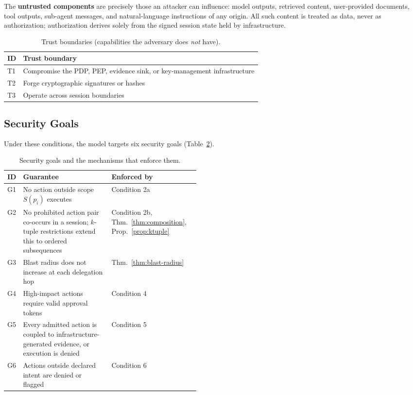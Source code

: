 \documentclass[sigconf,nonacm]{acmart}
\begin{document}
The \textbf{untrusted components} are precisely those an attacker can influence: model outputs, retrieved content, user-provided documents, tool outputs, sub-agent messages, and natural-language instructions of any origin. All such content is treated as data, never as authorization; authorization derives solely from the signed session state held by infrastructure.

\begin{table}[t]
\centering
\footnotesize
\caption{Trust boundaries (capabilities the adversary does \emph{not} have).}
\label{tab:trust}
\begin{tabularx}{\linewidth}{@{}lX@{}}
\toprule
\textbf{ID} & \textbf{Trust boundary} \\
\midrule
T1 & Compromise the PDP, PEP, evidence sink, or key-management infrastructure \\
T2 & Forge cryptographic signatures or hashes \\
T3 & Operate across session boundaries \\
\bottomrule
\end{tabularx}
\end{table}

\subsection{Security Goals}

Under these conditions, the model targets six security goals (Table~\ref{tab:guarantees-main}).

\begin{table}[t]
\centering
\footnotesize
\caption{Security goals and the mechanisms that enforce them.}
\label{tab:guarantees-main}
\begin{tabularx}{\linewidth}{@{}l>{\raggedright\arraybackslash}p{0.46\linewidth}X@{}}
\toprule
\textbf{ID} & \textbf{Guarantee} & \textbf{Enforced by} \\
\midrule
G1 & No action outside scope $S(p_i)$ executes & Condition 2a \\
G2 & No prohibited action pair co-occurs in a session; $k$-tuple restrictions extend this to ordered subsequences & Condition 2b, Thm.~\ref{thm:composition}, Prop.~\ref{prop:ktuple} \\
G3 & Blast radius does not increase at each delegation hop & Thm.~\ref{thm:blast-radius} \\
G4 & High-impact actions require valid approval tokens & Condition 4 \\
G5 & Every admitted action is coupled to infrastructure-generated evidence, or execution is denied & Condition 5 \\
G6 & Actions outside declared intent are denied or flagged & Condition 6 \\
\bottomrule
\end{tabularx}
\end{table}
\end{document}
